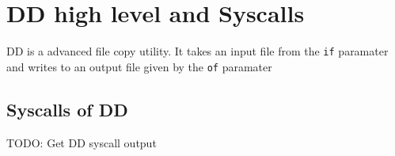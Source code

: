 \section{DD high level and Syscalls}
DD is a advanced file copy utility. It takes an input file from the \texttt{if} paramater and writes to an output file given by the \texttt{of} paramater

\subsection{Syscalls of DD}

TODO: Get DD syscall output